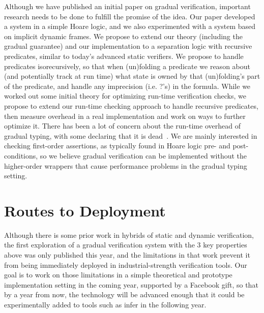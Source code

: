 \documentclass[10pt,twocolumn]{article}
\begin{document}
\begin{sloppypar}
Although we have published an initial paper on gradual verification, important research needs to be done to fulfill the promise of the idea.  Our paper developed a system in a simple Hoare logic, and we also experimented with a system based on implicit dynamic frames.  We propose to extend our theory (including the gradual guarantee) and our implementation to a separation logic with recursive predicates, similar to today's advanced static verifiers.  We propose to handle predicates isorecursively, so that when (un)folding a predicate we reason about (and potentially track at run time) what state is owned by that (un)folding's part of the predicate, and handle any imprecision (i.e. ?'s) in the formula. While we worked out some initial theory for optimizing run-time verification checks, we propose to extend our run-time checking approach to handle recursive predicates, then measure overhead in a real implementation and work on ways to further optimize it.  There has been a lot of concern about the run-time overhead of gradual typing, with some declaring that it is dead~\cite{dead}.  We are mainly interested in checking first-order assertions, as typically found in Hoare logic pre- and post-conditions, so we believe gradual verification can be implemented without the higher-order wrappers that cause performance problems in the gradual typing setting.

\section{Routes to Deployment}

Although there is some prior work in hybrids of static and dynamic verification, the first exploration of a gradual verification system with the 3 key properties above was only published this year, and the limitations in that work prevent it from being immediately deployed in industrial-strength verification tools.  Our goal is to work on those limitations in a simple theoretical and prototype implementation setting in the coming year, supported by a Facebook gift, so that by a year from now, the technology will be advanced enough that it could be experimentally added to tools such as infer in the following year.


\end{sloppypar}
\end{document}
